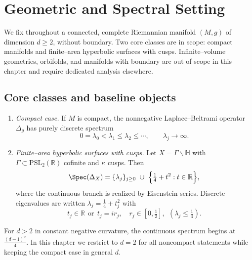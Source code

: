 
\section{Geometric and Spectral Setting}\relax \hspace{0pt}
\label{sec:geom-spectral-setting-part1}
\noindent
We fix throughout a connected, complete Riemannian manifold $(M,g)$ of dimension $d\ge 2$, without boundary. 
Two core classes are in scope: compact manifolds and finite–area hyperbolic surfaces with cusps. 
Infinite–volume geometries, orbifolds, and manifolds with boundary are out of scope in this chapter and require dedicated analysis elsewhere. %

\subsection{Core classes and baseline objects}\relax \hspace{0pt}
\label{subsec:classes-part1}
\begin{definition}\label{def:core-classes}\relax
\hspace{0pt}
\begin{enumerate}
  \item \emph{Compact case.} If $M$ is compact, the nonnegative Laplace–Beltrami operator $\Delta_g$ has purely discrete spectrum 
  \[
     0=\lambda_0<\lambda_1\le \lambda_2\le \cdots,\qquad \lambda_j\to\infty.
  \]
  \item \emph{Finite–area hyperbolic surfaces with cusps.} Let $X=\Gamma\backslash\mathbb{H}$ with $\Gamma\subset\mathrm{PSL}_2(\mathbb{R})$ cofinite and $\kappa$ cusps. Then
  \[
    \Spec(\Delta_X)=\{\lambda_j\}_{j\ge 0}\ \cup\ \Big\{\tfrac14+t^2: t\in\mathbb{R}\Big\},
  \]
  where the continuous branch is realized by Eisenstein series. Discrete eigenvalues are written $\lambda_j=\tfrac14+t_j^2$ with
  \[
    t_j\in\mathbb{R}\ \ \text{or}\ \ t_j=i r_j,\quad r_j\in[0,\tfrac12],\ \ (\lambda_j\le \tfrac14).
  \]
\end{enumerate}
\end{definition}
\begin{remark}\relax
For $d>2$ in constant negative curvature, the continuous spectrum begins at $\frac{(d-1)^2}{4}$. In this chapter we restrict to $d=2$ for all noncompact statements while keeping the compact case in general $d$. %
\end{remark}

